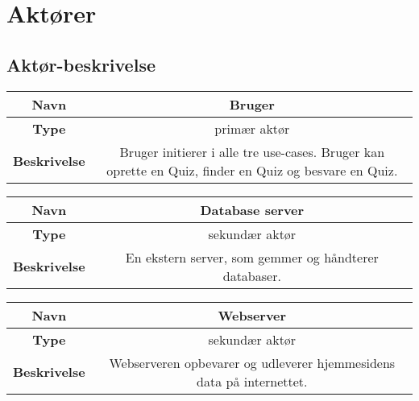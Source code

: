 \section{Aktører}




\subsection{Aktør-beskrivelse}

\begin{tabular}{|c|c|}

\hline 
\textbf{Navn} & Bruger \\ 
\hline 
\textbf{Type} & primær aktør \\ 
\hline 
\textbf{Beskrivelse} & Bruger initierer i alle tre use-cases. Bruger kan oprette en Quiz, finder en Quiz og besvare en Quiz.\\ 
\hline 

\end{tabular} 

\begin{tabular}{|c|c|}

\hline 
\textbf{Navn} & Database server \\ 
\hline 
\textbf{Type} & sekundær aktør \\ 
\hline 
\textbf{Beskrivelse} & En ekstern server, som gemmer og håndterer databaser.\\ 
\hline 

\end{tabular} 

\begin{tabular}{|c|c|}

\hline 
\textbf{Navn} & Webserver \\ 
\hline 
\textbf{Type} & sekundær aktør \\ 
\hline 
\textbf{Beskrivelse} & Webserveren opbevarer og udleverer hjemmesidens data på internettet.\\ 
\hline 

\end{tabular} 